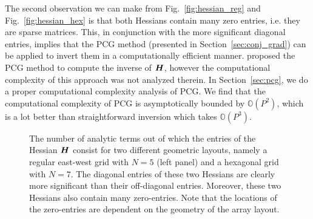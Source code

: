 \documentclass[useAMS,usenatbib]{mn2e}
\newcommand{\bH}{\bmath{H}}
\begin{document}
The second observation we can make from Fig.~\ref{fig:hessian_reg} and Fig.~\ref{fig:hessian_hex} is that both Hessians contain many zero entries, i.e. they are sparse matrices. This, in conjunction with the more significant diagonal entries, implies that the PCG method (presented in Section~\ref{sec:conj_grad}) 
can be applied to invert them in a computationally efficient manner. \citet{Liu2010} proposed the PCG method to compute the inverse of $\bH$, however the computational complexity of this approach was not analyzed therein.  
In Section~\ref{sec:pcg}, we do a proper computational complexity analysis of PCG. We find that the computational complexity of PCG is asymptotically bounded by $\mathbb{O}(P^2)$, which is 
a lot better than straightforward inversion which takes $\mathbb{O}(P^3)$. 

\begin{figure}
\centering
{}
\caption{The number of analytic terms out of which the entries of the Hessian $\bH$ consist for two different geometric layouts, namely a regular east-west grid with $N = 5$ (left panel) and 
a hexagonal grid with $N = 7$. The diagonal entries of these two Hessians are clearly more significant than their off-diagonal entries. Moreover, these two Hessians also 
contain many zero-entries. Note that the locations of the zero-entries are dependent on the geometry of the array layout.
\label{fig:hessian}} 
\end{figure}
\end{document}
